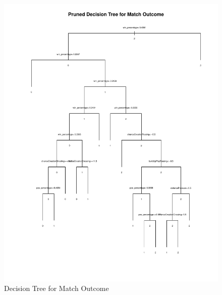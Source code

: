 \documentclass[11pt]{article}
\begin{document}
\begin{figure}[ht]
  \centering
  \includegraphics[scale=0.7]{tree}
  \caption{Decision Tree for Match Outcome}
  \label{fig:tree}
\end{figure}
\end{document}
